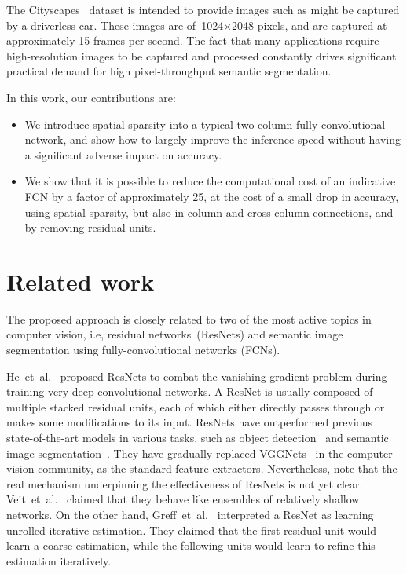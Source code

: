 \documentclass[10pt,twocolumn,letterpaper]{article}
\begin{document}
%
The Cityscapes~\cite{Cityscapes.CVPR.2016.Cordts} dataset is intended to provide images such as might be captured by a driverless car.
These images are of~1024$\times$2048 pixels, and are captured at approximately 15 frames per second.
%
%
%
%
The fact that many applications require high-resolution images to be captured and processed constantly drives significant practical demand for high pixel-throughput semantic segmentation.

In this work, our contributions are:
\begin{itemize}
\item
We introduce spatial sparsity into a typical two-column fully-convolutional network,
and show how to largely improve the inference speed without having a significant adverse impact on accuracy.
\item
We show that it is possible to reduce the computational cost of an indicative FCN by a factor of approximately 25,
at the cost of a small drop in accuracy, using spatial sparsity,
but also in-column and cross-column connections, and by removing residual units.
\end{itemize}


\section{Related work}
The proposed approach is closely related to two of the most active topics in computer vision,
i.e, residual networks~(ResNets) and semantic image segmentation using fully-convolutional networks (FCNs).

He~et~al.~\cite{ResNet.CVPR.2016.He,ResNet2.2016.He} proposed ResNets to combat the vanishing gradient problem during training very deep convolutional networks.
A ResNet is usually composed of multiple stacked residual units,
each of which either directly passes through or makes some modifications to its input.
ResNets have outperformed previous state-of-the-art models in various tasks, such as object detection~\cite{MNC.CVPR.2016.Dai} and semantic image segmentation~\cite{DeepLab2.2016.Chen}.
They have gradually replaced VGGNets~\cite{VGGNet.2014.Simonyan} in the computer vision community, as the standard feature extractors.
Nevertheless, note that the real mechanism underpinning the effectiveness of ResNets is not yet clear.
Veit~et~al.~\cite{UnraveledResNet.2016.Veit} claimed that they behave like ensembles of relatively shallow networks.
On the other hand, Greff~et~al.~\cite{UnrolledIterativeEstimation.ICLR.2017.Greff} interpreted a ResNet as learning unrolled iterative estimation.
They claimed that the first residual unit would learn a coarse estimation,
while the following units would learn to refine this estimation iteratively.
\end{document}
